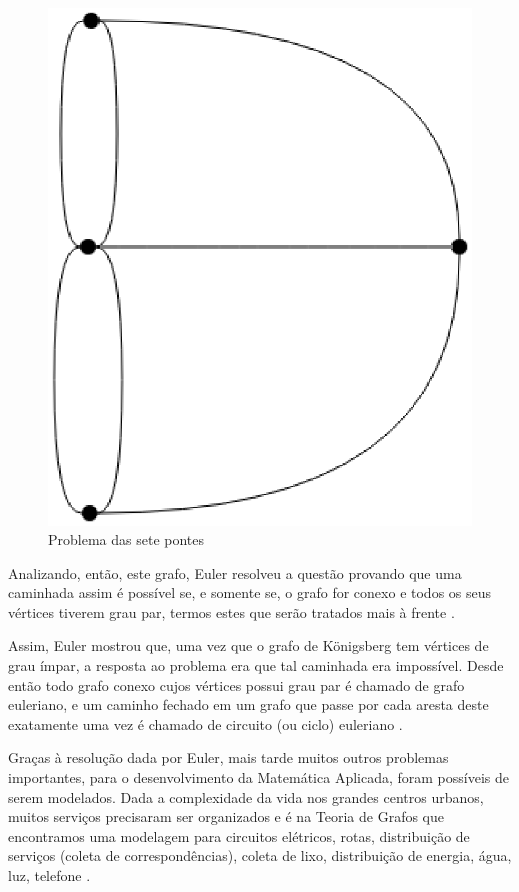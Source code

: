 \begin{figure}[!h]
	\centering
	\includegraphics[scale=0.5]{figuras/capitulo1/sete_pontes.eps}
	\caption{Problema das sete pontes}
	\label{sete_pontes}
\end{figure}

Analizando, então, este grafo, Euler resolveu a questão provando que uma caminhada assim é possível se, e somente se, o grafo for conexo e todos os seus vértices tiverem grau par, termos estes que serão tratados mais à frente \cite{Malta:2008}.

Assim, Euler mostrou que, uma vez que o grafo de Königsberg tem vértices de grau ímpar, a resposta ao problema era que tal caminhada era impossível. Desde então todo grafo conexo cujos vértices possui grau par é chamado de grafo euleriano, e um caminho fechado em um grafo que passe por cada aresta deste exatamente uma vez é chamado de circuito (ou ciclo) euleriano \cite{Malta:2008}.

Graças à resolução dada por Euler, mais tarde muitos outros problemas importantes, para o desenvolvimento da Matemática Aplicada, foram possíveis de serem modelados. Dada a complexidade da vida nos grandes centros urbanos, muitos serviços precisaram ser organizados e é na Teoria de Grafos que encontramos uma modelagem para circuitos elétricos, rotas, distribuição de serviços (coleta de correspondências), coleta de lixo, distribuição de energia, água, luz, telefone \cite{Mello:2007}.

